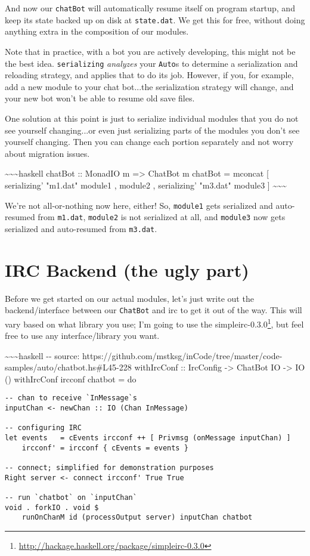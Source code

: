 \documentclass[]{article}
\renewcommand{\href}[2]{#2\footnote{\url{#1}}}
\begin{document}
And now our \texttt{chatBot} will automatically resume itself on program
startup, and keep its state backed up on disk at \texttt{state.dat}. We get this
for free, without doing anything extra in the composition of our modules.

Note that in practice, with a bot you are actively developing, this might not be
the best idea. \texttt{serializing\textquotesingle{}} \emph{analyzes} your
\texttt{Auto}s to determine a serialization and reloading strategy, and applies
that to do its job. However, if you, for example, add a new module to your chat
bot...the serialization strategy will change, and your new bot won't be able to
resume old save files.

One solution at this point is just to serialize individual modules that you do
not see yourself changing...or even just serializing parts of the modules you
don't see yourself changing. Then you can change each portion separately and not
worry about migration issues.

\textasciitilde{}\textasciitilde{}\textasciitilde{}haskell chatBot :: MonadIO m
=\textgreater{} ChatBot m chatBot = mconcat {[} serializing' "m1.dat" module1 ,
module2 , serializing' "m3.dat" module3 {]}
\textasciitilde{}\textasciitilde{}\textasciitilde{}

We're not all-or-nothing now here, either! So, \texttt{module1} gets serialized
and auto-resumed from \texttt{m1.dat}, \texttt{module2} is not serialized at
all, and \texttt{module3} now gets serialized and auto-resumed from
\texttt{m3.dat}.

\section{IRC Backend (the ugly part)}

Before we get started on our actual modules, let's just write out the
backend/interface between our \texttt{ChatBot} and irc to get it out of the way.
This will vary based on what library you use; I'm going to use the
\href{http://hackage.haskell.org/package/simpleirc-0.3.0}{simpleirc-0.3.0}, but
feel free to use any interface/library you want.

\textasciitilde{}\textasciitilde{}\textasciitilde{}haskell -\/- source:
https://github.com/mstksg/inCode/tree/master/code-samples/auto/chatbot.hs\#L45-228
withIrcConf :: IrcConfig -\textgreater{} ChatBot IO -\textgreater{} IO ()
withIrcConf ircconf chatbot = do

\begin{verbatim}
-- chan to receive `InMessage`s
inputChan <- newChan :: IO (Chan InMessage)

-- configuring IRC
let events   = cEvents ircconf ++ [ Privmsg (onMessage inputChan) ]
    ircconf' = ircconf { cEvents = events }

-- connect; simplified for demonstration purposes
Right server <- connect ircconf' True True

-- run `chatbot` on `inputChan`
void . forkIO . void $
    runOnChanM id (processOutput server) inputChan chatbot
\end{verbatim}
\end{document}
